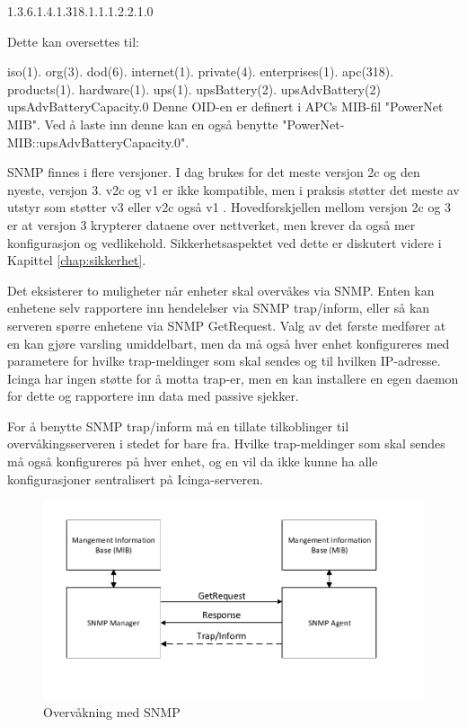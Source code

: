 1.3.6.1.4.1.318.1.1.1.2.2.1.0

Dette kan oversettes til:

iso(1). org(3). dod(6). internet(1). private(4). enterprises(1). apc(318). products(1). hardware(1). ups(1). upsBattery(2). upsAdvBattery(2) upsAdvBatteryCapacity.0
Denne OID-en er definert i APCs MIB-fil "PowerNet MIB". Ved å laste inn denne kan en også benytte "PowerNet-MIB::upsAdvBatteryCapacity.0".

SNMP finnes i flere versjoner. I dag brukes for det meste versjon 2c og den nyeste, versjon 3. v2c og v1 er ikke kompatible, men i praksis støtter det meste av utstyr som støtter v3 eller v2c også v1 \cite{rfc3584}. Hovedforskjellen mellom versjon 2c og 3 er at versjon 3 krypterer dataene over nettverket, men krever da også mer konfigurasjon og vedlikehold. Sikkerhetsaspektet ved dette er diskutert videre i Kapittel \ref{chap:sikkerhet}. 

Det eksisterer to muligheter når enheter skal overvåkes via SNMP. Enten kan enhetene selv rapportere inn hendelelser via SNMP trap/inform, eller så kan serveren spørre enhetene via SNMP GetRequest. Valg av det første medfører at en kan gjøre varsling umiddelbart, men da må også hver enhet konfigureres med parametere for hvilke trap-meldinger som skal sendes og til hvilken IP-adresse. Icinga har ingen støtte for å motta trap-er, men en kan installere en egen daemon for dette og rapportere inn data med passive sjekker. 

For å benytte SNMP trap/inform må en tillate tilkoblinger til overvåkingsserveren i stedet for bare fra. Hvilke trap-meldinger som skal sendes må også konfigureres på hver enhet, og en vil da ikke kunne ha alle konfigurasjoner sentralisert på Icinga-serveren.

\begin{figure}[H]
    \centering
    \includegraphics{img/SNMP}
    \caption{Overvåkning med SNMP}
    \label{SNMP}
\end{figure}

